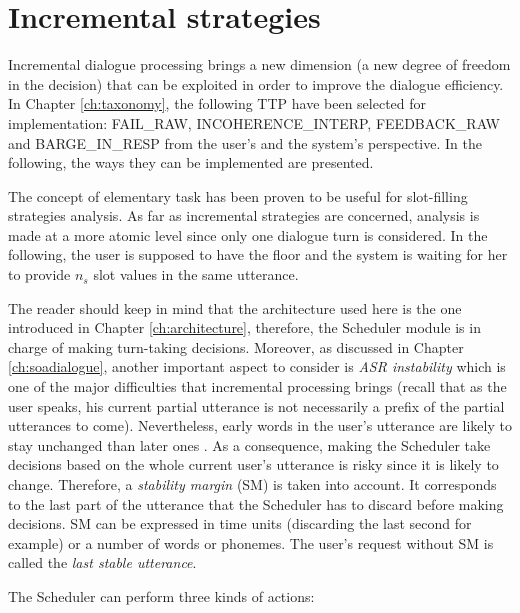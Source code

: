 \section{Incremental strategies}
\label{sec:incrstrat}

     Incremental dialogue processing brings a new dimension (a new degree of freedom in the decision) that can be exploited in order to improve the dialogue efficiency. In Chapter \ref{ch:taxonomy}, the following TTP have been selected for implementation: FAIL\_RAW, INCOHERENCE\_INTERP, FEEDBACK\_RAW and BARGE\_IN\_RESP from the user's and the system's perspective. In the following, the ways they can be implemented are presented.

     The concept of elementary task has been proven to be useful for slot-filling strategies analysis. As far as incremental strategies are concerned, analysis is made at a more atomic level since only one dialogue turn is considered. In the following, the user is supposed to have the floor and the system is waiting for her to provide $n_s$ slot values in the same utterance.

     The reader should keep in mind that the architecture used here is the one introduced in Chapter \ref{ch:architecture}, therefore, the Scheduler module is in charge of making turn-taking decisions. Moreover, as discussed in Chapter \ref{ch:soadialogue}, another important aspect to consider is \textit{ASR instability} which is one of the major difficulties that incremental processing brings (recall that as the user speaks, his current partial utterance is not necessarily a prefix of the partial utterances to come). Nevertheless, early words in the user's utterance are likely to stay unchanged than later ones \cite{McGraw2012}. As a consequence, making the Scheduler take decisions based on the whole current user's utterance is risky since it is likely to change. Therefore, a \textit{stability margin} (SM) is taken into account. It corresponds to the last part of the utterance that the Scheduler has to discard before making decisions. SM can be expressed in time units (discarding the last second for example) or a number of words or phonemes. The user's request without SM is called the \textit{last stable utterance}.
		
     The Scheduler can perform three kinds of actions:

